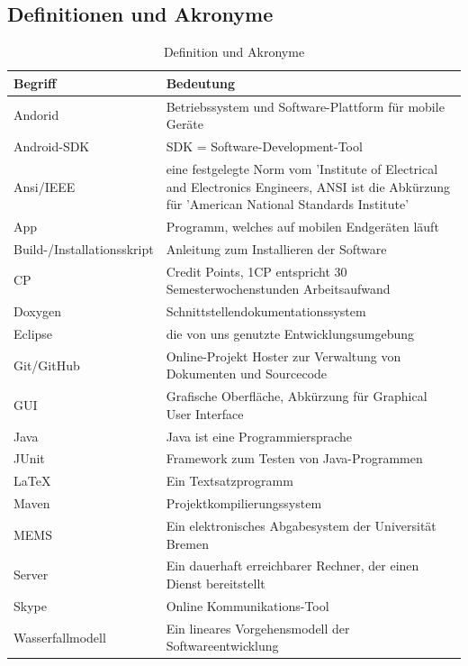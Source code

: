 \documentclass[fontsize=12pt,paper=a4,twoside]{scrartcl}
\begin{document}
{\renewcommand\section[2]{}

}

\newpage

\subsection{Definitionen und Akronyme\\}

\begin{table}[!h]
\caption{Definition und Akronyme}
\centering
\begin{tabular}{p{7cm}|p{7cm}}
\hline Begriff & Bedeutung\\ \hline
\hline Andorid & Betriebssystem und Software-Plattform für mobile Geräte\\
\hline Android-SDK & SDK = Software-Development-Tool\\
\hline Ansi/IEEE & eine festgelegte Norm vom 'Institute of Electrical and Electronics Engineers, ANSI ist die Abkürzung für 'American National Standards Institute'\\
\hline App & Programm, welches auf mobilen Endgeräten läuft\\
\hline Build-/Installationsskript & Anleitung zum Installieren der Software\\
\hline CP & Credit Points, 1CP entspricht 30 Semesterwochenstunden Arbeitsaufwand\\
\hline Doxygen & Schnittstellendokumentationssystem\\
\hline Eclipse & die von uns genutzte Entwicklungsumgebung\\
\hline Git/GitHub & Online-Projekt Hoster zur Verwaltung von Dokumenten und Sourcecode\\
\hline GUI & Grafische Oberfläche, Abkürzung für Graphical User Interface\\
\hline Java & Java ist eine Programmiersprache\\
\hline JUnit & Framework zum Testen von Java-Programmen\\
\hline \LaTeX & Ein Textsatzprogramm\\
\hline Maven & Projektkompilierungssystem\\
\hline MEMS & Ein elektronisches Abgabesystem der Universität Bremen\\
\hline Server & Ein dauerhaft erreichbarer Rechner, der einen Dienst bereitstellt\\
\hline Skype & Online Kommunikations-Tool\\
\hline Wasserfallmodell & Ein lineares Vorgehensmodell der Softwareentwicklung\\ 
\hline
\end{tabular}
\end{table}
\end{document}
